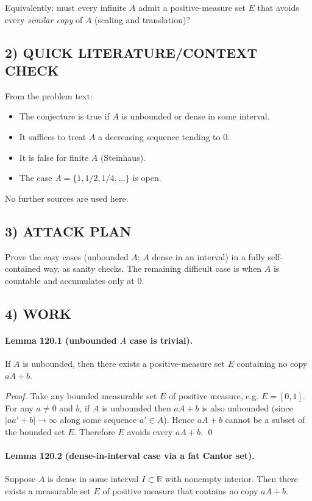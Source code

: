 Equivalently: must every infinite $A$ admit a positive-measure set $E$ that avoids every \emph{similar copy} of $A$ (scaling and translation)?

\subsection*{2) QUICK LITERATURE/CONTEXT CHECK}
From the problem text:
\begin{itemize}
\item The conjecture is true if $A$ is unbounded or dense in some interval.
\item It suffices to treat $A$ a decreasing sequence tending to $0$.
\item It is false for finite $A$ (Steinhaus).
\item The case $A=\{1,1/2,1/4,\dots\}$ is open.
\end{itemize}
No further sources are used here.

\subsection*{3) ATTACK PLAN}
Prove the easy cases (unbounded $A$; $A$ dense in an interval) in a fully self-contained way, as sanity checks.  The remaining difficult case is when $A$ is countable and accumulates only at $0$.

\subsection*{4) WORK}
\paragraph{Lemma 120.1 (unbounded $A$ case is trivial).}
If $A$ is unbounded, then there exists a positive-measure set $E$ containing no copy $aA+b$.

\emph{Proof.}
Take any bounded measurable set $E$ of positive measure, e.g. $E=[0,1]$.  For any $a\neq0$ and $b$, if $A$ is unbounded then $aA+b$ is also unbounded (since $|aa'+b|\to\infty$ along some sequence $a'\in A$).  Hence $aA+b$ cannot be a subset of the bounded set $E$.  Therefore $E$ avoids every $aA+b$. \qed

\paragraph{Lemma 120.2 (dense-in-interval case via a fat Cantor set).}
Suppose $A$ is dense in some interval $I\subset\mathbb R$ with nonempty interior.  Then there exists a measurable set $E$ of positive measure that contains no copy $aA+b$.

